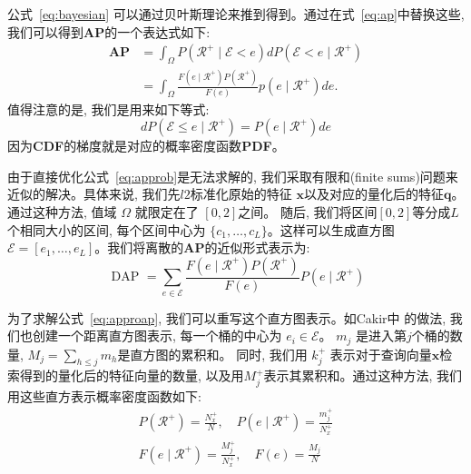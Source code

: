 公式~\ref{eq:bayesian} 可以通过贝叶斯理论来推到得到。通过在式~\ref{eq:ap}中替换这些, 我们可以得到\textbf{AP}的一个表达式如下:
\begin{equation}
    \label{eq:approb}
    \begin{aligned}
    \textbf{AP} &=\int_{\Omega} P\left(\mathcal{R}^{+} \mid \mathcal{E}<e\right) d P\left(\mathcal{E}<e \mid \mathcal{R}^{+}\right) \\
    &=\int_{\Omega} \frac{F\left(e \mid \mathcal{R}^{+}\right) P\left(\mathcal{R}^{+}\right)}{F(e)} p\left(e \mid \mathcal{R}^{+}\right) d e .
    \end{aligned}
\end{equation}
值得注意的是, 我们是用来如下等式:
\begin{equation}
    dP(\mathcal{E} \le e \mid \mathcal{R}^{+}) = P(e \mid \mathcal{R}^{+}) de
\end{equation}
因为\textbf{CDF}的梯度就是对应的概率密度函数\textbf{PDF}。\par 
由于直接优化公式~\ref{eq:approb}是无法求解的, 我们采取有限和(finite sums)问题来近似的解决。具体来说, 我们先$l2$标准化原始的特征 $\mathbf{x}$以及对应的量化后的特征$\mathbf{q}$。通过这种方法, 值域 $\Omega$ 就限定在了 $[0,2]$之间。 随后, 我们将区间$[0,2]$等分成$L$个相同大小的区间, 每个区间中心为
$\{c_1, \ldots, c_L\}$。这样可以生成直方图 $\mathcal{E} = [e_1,\ldots,e_L]$。我们将离散的\textbf{AP}的近似形式表示为:
\begin{equation}
    \label{eq:approap}
    \text { DAP }=\sum_{e \in \mathcal{E}} \frac{F\left(e \mid \mathcal{R}^{+}\right) P\left(\mathcal{R}^{+}\right)}{F(e)} P\left(e \mid \mathcal{R}^{+}\right)
\end{equation} \par
为了求解公式~\ref{eq:approap}, 我们可以重写这个直方图表示。如Cakir中 \cite{cakir2019deep}的做法, 我们也创建一个距离直方图表示, 每一个桶的中心为 $e_i \in \mathcal{E}$。 $m_j$ 是进入第$j$个桶的数量,  $M_j = \sum_{h\leq j}m_h$是直方图的累积和。 同时, 我们用 $k_j^{+}$ 表示对于查询向量$\mathbf{x}$检索得到的量化后的特征向量的数量, 以及用$M_j^+$表示其累积和。通过这种方法, 我们用这些直方表示概率密度函数如下:
\begin{equation}
    \begin{aligned}
         P(\mathcal{R}^{+}) = \frac{N_{x}^{+}}{N}, \quad P(e \mid \mathcal{R}^{+}) = \frac{m_j^{+}}{N_{x}^{+}} \\
         F(e \mid \mathcal{R}^{+}) = \frac{M_j^+}{N_x^+},\quad F(e) = \frac{M_j}{N}
    \end{aligned}
\end{equation}
